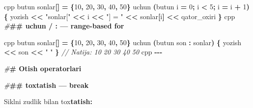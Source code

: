\documentclass[a4paper,11pt,twoside,openright]{book}
\newenvironment{Shaded}{\begin{snugshade}}{\end{snugshade}}
\newcommand{\CharTok}[1]{\textcolor[rgb]{0.31,0.60,0.02}{#1}}
\newcommand{\CommentTok}[1]{\textcolor[rgb]{0.56,0.35,0.01}{\textit{#1}}}
\newcommand{\DecValTok}[1]{\textcolor[rgb]{0.00,0.00,0.81}{#1}}
\newcommand{\ErrorTok}[1]{\textcolor[rgb]{0.64,0.00,0.00}{\textbf{#1}}}
\newcommand{\NormalTok}[1]{#1}
\newcommand{\OperatorTok}[1]{\textcolor[rgb]{0.81,0.36,0.00}{\textbf{#1}}}
\newcommand{\PreprocessorTok}[1]{\textcolor[rgb]{0.56,0.35,0.01}{\textit{#1}}}
\newcommand{\StringTok}[1]{\textcolor[rgb]{0.31,0.60,0.02}{#1}}
\begin{document}
\begin{Shaded}
\begin{Highlighting}[]
\ErrorTok{\textasciigrave{}\textasciigrave{}\textasciigrave{}}\NormalTok{cpp}
\NormalTok{butun sonlar}\OperatorTok{[]} \OperatorTok{=} \OperatorTok{\{}\DecValTok{10}\OperatorTok{,} \DecValTok{20}\OperatorTok{,} \DecValTok{30}\OperatorTok{,} \DecValTok{40}\OperatorTok{,} \DecValTok{50}\OperatorTok{\}}
\NormalTok{uchun }\OperatorTok{(}\NormalTok{butun i }\OperatorTok{=} \DecValTok{0}\OperatorTok{;}\NormalTok{ i }\OperatorTok{\textless{}} \DecValTok{5}\OperatorTok{;}\NormalTok{ i }\OperatorTok{=}\NormalTok{ i }\OperatorTok{+} \DecValTok{1}\OperatorTok{)} \OperatorTok{\{}
\NormalTok{    yozish }\OperatorTok{\textless{}\textless{}} \StringTok{"sonlar["} \OperatorTok{\textless{}\textless{}}\NormalTok{ i }\OperatorTok{\textless{}\textless{}} \StringTok{"] = "} \OperatorTok{\textless{}\textless{}}\NormalTok{ sonlar}\OperatorTok{[}\NormalTok{i}\OperatorTok{]} \OperatorTok{\textless{}\textless{}}\NormalTok{ qator\_oxiri}
\OperatorTok{\}}
\ErrorTok{\textasciigrave{}\textasciigrave{}\textasciigrave{}}\NormalTok{cpp}
\PreprocessorTok{\#}\ErrorTok{\#\# \textasciigrave{}uchun\textasciigrave{} / \textasciigrave{}:\textasciigrave{} — range{-}based for}

\ErrorTok{\textasciigrave{}\textasciigrave{}\textasciigrave{}}\NormalTok{cpp}
\NormalTok{butun sonlar}\OperatorTok{[]} \OperatorTok{=} \OperatorTok{\{}\DecValTok{10}\OperatorTok{,} \DecValTok{20}\OperatorTok{,} \DecValTok{30}\OperatorTok{,} \DecValTok{40}\OperatorTok{,} \DecValTok{50}\OperatorTok{\}}
\NormalTok{uchun }\OperatorTok{(}\NormalTok{butun son }\OperatorTok{:}\NormalTok{ sonlar}\OperatorTok{)} \OperatorTok{\{}
\NormalTok{    yozish }\OperatorTok{\textless{}\textless{}}\NormalTok{ son }\OperatorTok{\textless{}\textless{}} \StringTok{" "}
\OperatorTok{\}}
\CommentTok{// Natija: 10 20 30 40 50}
\ErrorTok{\textasciigrave{}\textasciigrave{}\textasciigrave{}}\NormalTok{cpp}
\OperatorTok{{-}{-}{-}}

\PreprocessorTok{\#}\ErrorTok{\# O\textquotesingle{}tish operatorlari}

\PreprocessorTok{\#}\ErrorTok{\#\# \textasciigrave{}to\textquotesingle{}xtatish\textasciigrave{} — \textasciigrave{}break\textasciigrave{}}

\NormalTok{Siklni zudlik bilan to}\CharTok{\textquotesingle{}x}\ErrorTok{tatish:}


\end{Highlighting}
\end{Shaded}
\end{document}
